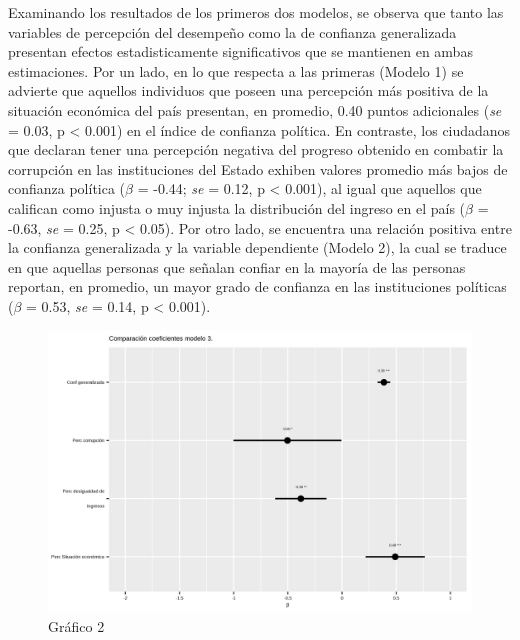 \documentclass[12pt,twoside]{templates/facsothesis}
\begin{document}
Examinando los resultados de los primeros dos modelos, se observa que tanto las variables de percepción del desempeño como la de confianza generalizada presentan efectos estadisticamente significativos que se mantienen en ambas estimaciones. Por un lado, en lo que respecta a las primeras (Modelo 1) se advierte que aquellos individuos que poseen una percepción más positiva de la situación económica del país presentan, en promedio, 0.40 puntos adicionales (\emph{se} = 0.03, p \textless{} 0.001) en el índice de confianza política. En contraste, los ciudadanos que declaran tener una percepción negativa del progreso obtenido en combatir la corrupción en las instituciones del Estado exhiben valores promedio más bajos de confianza política (\(\beta\) = -0.44; \emph{se} = 0.12, p \textless{} 0.001), al igual que aquellos que califican como injusta o muy injusta la distribución del ingreso en el país (\(\beta\) = -0.63, \emph{se} = 0.25, p \textless{} 0.05). Por otro lado, se encuentra una relación positiva entre la confianza generalizada y la variable dependiente (Modelo 2), la cual se traduce en que aquellas personas que señalan confiar en la mayoría de las personas reportan, en promedio, un mayor grado de confianza en las instituciones políticas (\(\beta\) = 0.53, \emph{se} = 0.14, p \textless{} 0.001).

\begin{figure}[!ht]

{\centering \includegraphics[width=1\linewidth,]{IPO/output/graphs/coeficientes} 

}

\caption{Gráfico 2}\label{fig:grafico-2}
\end{figure}
\end{document}
